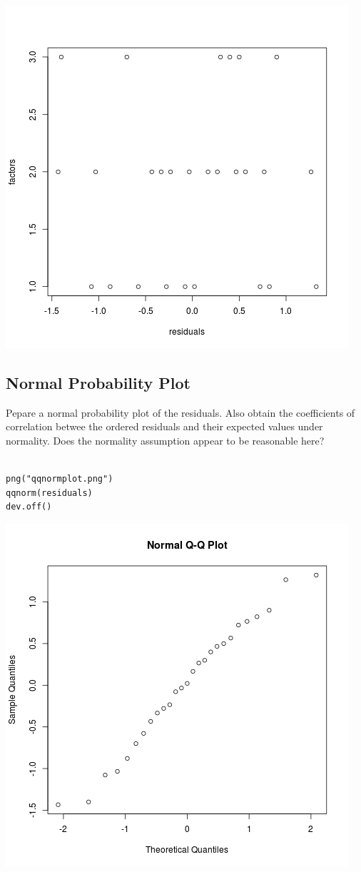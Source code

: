 \documentclass[11pt]{article}
\begin{document}
\includegraphics[width=.9\linewidth]{dotplot.png}
\subsection{Normal Probability Plot}
\label{sec-1-2}

Pepare a normal probability plot of the residuals.  Also obtain the
coefficients of correlation betwee the ordered residuals and their
expected values under normality.  Does the normality assumption
appear to be reasonable here?

\begin{verbatim}

png("qqnormplot.png")
qqnorm(residuals)
dev.off()
\end{verbatim}

\includegraphics[width=.9\linewidth]{qqnormplot.png}
\end{document}
